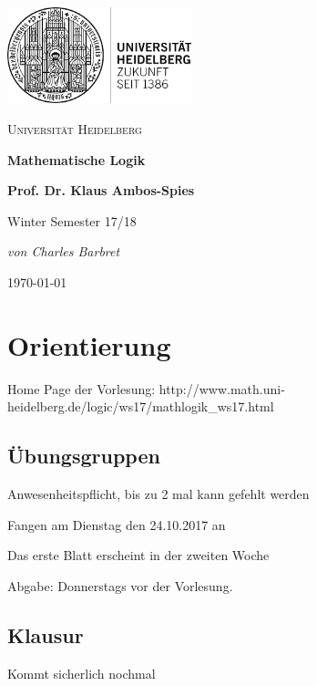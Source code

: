 \documentclass[12pt,a4paper]{article} %
\begin{document}
	\begin{titlepage} %
	\centering
	\includegraphics[width=0.40\textwidth]{UniLogo}\par\vspace{1cm}
		{\scshape\LARGE Universität Heidelberg \par}
		\vspace{1cm}
		{\huge\bfseries Mathematische Logik \par}
		\vspace{1cm}
		{\Huge\bfseries Prof. Dr. Klaus Ambos-Spies}
		\vspace{1cm}
		{\Large Winter Semester 17/18 \par}
		\vspace{2cm}
		{\Large\itshape von Charles Barbret \par}
		
		\vfill

		{\large \gerDate\today\par}
	\end{titlepage}

\tableofcontents %
\newpage %


\section{Orientierung}
Home Page der Vorlesung:
http://www.math.uni-heidelberg.de/logic/ws17/mathlogik\_ws17.html

\subsection{Übungsgruppen}
Anwesenheitspflicht, bis zu 2 mal kann gefehlt werden

Fangen am Dienstag den 24.10.2017 an

Das erste Blatt erscheint in der zweiten Woche

Abgabe: Donnerstags vor der Vorlesung.
\subsection{Klausur}
Kommt sicherlich nochmal
\end{document}
